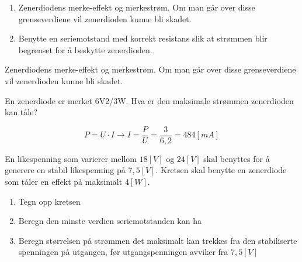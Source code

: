 \begin{solution}[name=Løsningsforslag oppgave]
\begin{enumerate}[label=\roman*)]
	\item Zenerdiodens merke-effekt og merkestrøm. Om man går over disse grenseverdiene vil zenerdioden kunne bli skadet.
	\item Benytte en seriemotstand med korrekt resistans slik at strømmen blir begrenset for å beskytte zenerdioden.
\end{enumerate}

Zenerdiodens merke-effekt og merkestrøm. Om man går over disse grenseverdiene vil zenerdioden kunne bli skadet.
\end{solution}


\begin{question}[name=Oppgave, topic=zenerdioder]
En zenerdiode er merket 6V2/3W. Hva er den maksimale strømmen zenerdioden kan tåle?
\end{question}

\vspace{0.5cm} %

\begin{solution}[name=Løsningsforslag oppgave]
\[P=U\cdot I\rightarrow I=\frac{P}{U}=\frac{3}{6,2}=484 [mA]\]

\end{solution}



\begin{question}[name=Oppgave, topic=zenerdioder]
En likespenning som varierer mellom $18 [V]$ og $24 [V]$ skal benyttes for å generere en stabil likespenning på $7,5 [V]$. Kretsen skal benytte en zenerdiode som tåler en effekt på maksimalt $4 [W]$.

\begin{enumerate}[label=\roman*)]
	\item Tegn opp kretsen
	\item Beregn den minste verdien seriemotstanden kan ha
	\item Beregn størrelsen på strømmen det maksimalt kan trekkes fra den stabiliserte spenningen på utgangen, før utgangspenningen avviker fra $7,5 [V]$
\end{enumerate}
\end{question}

\vspace{0.5cm} %

